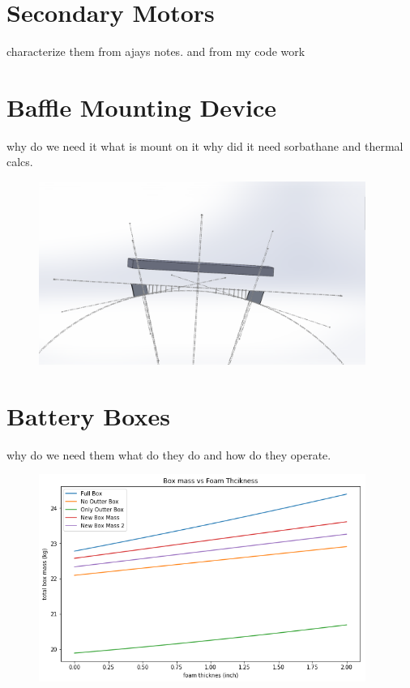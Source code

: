 \section{Secondary Motors}
characterize them from ajays notes. and from my code work

\section{Baffle Mounting Device}
why do we need it what is mount on it why did it need sorbathane and thermal calcs.

\begin{figure}
    \begin{small}
        \begin{center}
            \includegraphics[width=0.95\textwidth]{Hardware/figs/baffle_mount.png}
        \end{center}
        \caption{}
        \label{fig:}
    \end{small}
\end{figure}


\section{Battery Boxes}
why do we need them what do they do and how do they operate.

\begin{figure}
    \begin{small}
        \begin{center}
            \includegraphics[width=0.95\textwidth]{Hardware/figs/battery_box_mass.png}
        \end{center}
        \caption{}
        \label{fig:}
    \end{small}
\end{figure}

